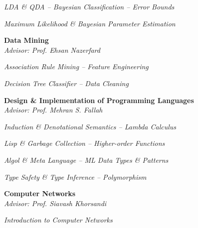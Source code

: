 \documentclass[margin, 10pt]{res} %
\begin{document}
\begin{resume}
\begin{innerlist}
			\item \textit{LDA \& QDA -- Bayesian Classification -- Error Bounds} \href{https://github.com/aligholamee/Patterns/raw/master/docs/assignment-2/SPR_9531504_HW2.pdf}{\hfill\UrlFont[docs]}

			\item \textit{Maximum Likelihood \& Bayesian Parameter Estimation} \href{https://github.com/aligholamee/Patterns/raw/master/docs/assignment-3/SPR_9531504_HW3.pdf}{\hfill\UrlFont[docs]}
		\end{innerlist}

        \textbf{Data Mining}\\
		\textit{Advisor: Prof. Ehsan Nazerfard}
		\begin{innerlist}
			\item \textit{Association Rule Mining -- Feature Engineering} \href{https://github.com/aligholamee/Datadigger/raw/master/docs/assignment-1/report/DM_9531504_HW1.pdf}{\hfill\UrlFont[docs]}
			
			\item \textit{Decision Tree Classifier -- Data Cleaning} \href{https://github.com/aligholamee/Datadigger/raw/master/docs/assignment-2/report/DM_9531504_HW2.pdf}{\hfill\UrlFont[docs]}
		\end{innerlist}

        \textbf{Design \& Implementation of Programming Languages}\\
    	\textit{Advisor: Prof. Mehran S. Fallah}
	    \begin{innerlist}
	    	\item \textit{Induction \& Denotational Semantics -- Lambda Calculus} \href{https://github.com/aligholamee/HALFLIFE/raw/master/reports/PL29531504.pdf}{\hfill\UrlFont[docs]}
	    	\item \textit{Lisp \& Garbage Collection -- Higher-order Functions} \href{https://github.com/aligholamee/HALFLIFE/raw/master/reports/PL39531504.pdf}{\hfill\UrlFont[docs]}
	    	\item \textit{Algol \& Meta Language -- ML Data Types \& Patterns} \href{https://github.com/aligholamee/HALFLIFE/raw/master/reports/PL49531504.pdf}{\hfill\UrlFont[docs]}
	    	\item \textit{Type Safety \& Type Inference -- Polymorphism} \href{https://github.com/aligholamee/HALFLIFE/raw/master/reports/PL49531504.pdf}{\hfill\UrlFont[docs]}
	    \end{innerlist}

        \textbf{Computer Networks}\\
		\textit{Advisor: Prof. Siavash Khorsandi}
		\begin{innerlist}
			\item \textit{Introduction to Computer Networks} \href{https://github.com/aligholamee/Compnets/raw/master/docs/assignment-1/compnet_assignment_1_9531504.pdf}{\hfill\UrlFont[docs]}
		

\end{innerlist}
\end{resume}
\end{document}
